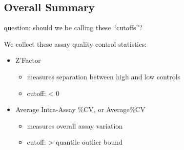 \documentclass[
]{article}
\providecommand{\tightlist}{%
  \setlength{\itemsep}{0pt}\setlength{\parskip}{0pt}}
\begin{document}
\subsection{Overall Summary}\label{overall-summary-1}

question: should we be calling these ``cutoffs''?

We collect these assay quality control statistics:

\begin{itemize}
\tightlist
\item
  Z'Factor

  \begin{itemize}
  \tightlist
  \item
    measures separation between high and low controls
  \item
    cutoff: \textless{} 0
  \end{itemize}
\item
  Average Intra-Assay \%CV, or Average\%CV

  \begin{itemize}
  \tightlist
  \item
    measures overall assay variation
  \item
    cutoff: \textgreater{} quantile outlier bound
  \end{itemize}
\end{itemize}
\end{document}
